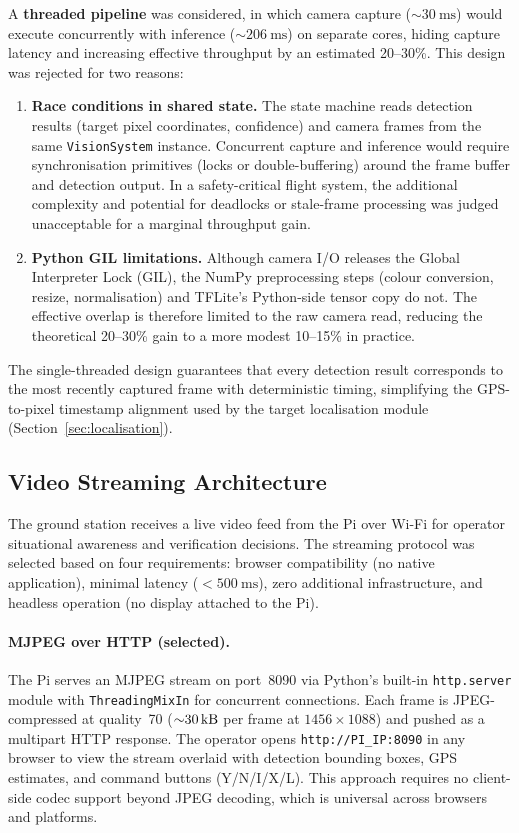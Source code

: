 A \textbf{threaded pipeline} was considered, in which camera capture (${\sim}\SI{30}{\milli\second}$) would execute concurrently with inference (${\sim}\SI{206}{\milli\second}$) on separate cores, hiding capture latency and increasing effective throughput by an estimated 20--30\%.  This design was rejected for two reasons:

\begin{enumerate}
  \item \textbf{Race conditions in shared state.}  The state machine reads detection results (target pixel coordinates, confidence) and camera frames from the same \texttt{VisionSystem} instance.  Concurrent capture and inference would require synchronisation primitives (locks or double-buffering) around the frame buffer and detection output.  In a safety-critical flight system, the additional complexity and potential for deadlocks or stale-frame processing was judged unacceptable for a marginal throughput gain.

  \item \textbf{Python GIL limitations.}  Although camera I/O releases the Global Interpreter Lock (GIL), the NumPy preprocessing steps (colour conversion, resize, normalisation) and TFLite's Python-side tensor copy do not.  The effective overlap is therefore limited to the raw camera read, reducing the theoretical 20--30\% gain to a more modest 10--15\% in practice.
\end{enumerate}

The single-threaded design guarantees that every detection result corresponds to the most recently captured frame with deterministic timing, simplifying the GPS-to-pixel timestamp alignment used by the target localisation module (Section~\ref{sec:localisation}).

\subsection{Video Streaming Architecture}\label{sec:cv:inference:streaming}

The ground station receives a live video feed from the Pi over Wi-Fi for operator situational awareness and verification decisions.  The streaming protocol was selected based on four requirements: browser compatibility (no native application), minimal latency ($<\SI{500}{\milli\second}$), zero additional infrastructure, and headless operation (no display attached to the Pi).

\paragraph{MJPEG over HTTP (selected).}
The Pi serves an MJPEG stream on port~8090 via Python's built-in \texttt{http.server} module with \texttt{ThreadingMixIn} for concurrent connections.  Each frame is JPEG-compressed at quality~70 (${\sim}\SI{30}{\kilo\byte}$ per frame at $1456\times1088$) and pushed as a multipart HTTP response.  The operator opens \texttt{http://PI\_IP:8090} in any browser to view the stream overlaid with detection bounding boxes, GPS estimates, and command buttons (Y/N/I/X/L).  This approach requires no client-side codec support beyond JPEG decoding, which is universal across browsers and platforms.

